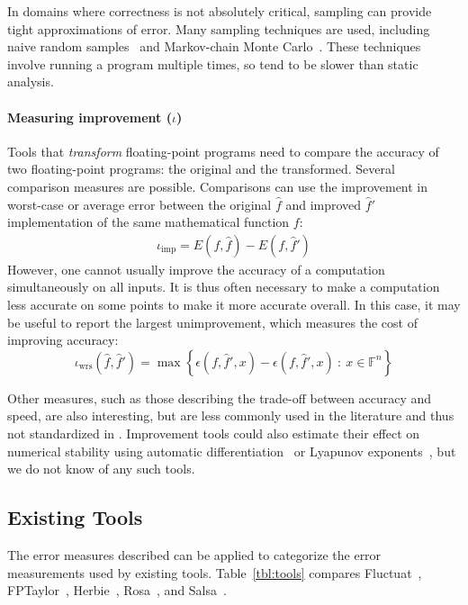 \documentclass[main.tex]{subfiles}
\begin{document}
In domains where correctness is not absolutely critical,
  sampling can provide tight approximations of error.
Many sampling techniques are used,
  including naive random samples~\cite{pavel15}
  and Markov-chain Monte Carlo~\cite{stoke-fp}.
These techniques involve running a program multiple times,
  so tend to be slower than static analysis.

\paragraph{Measuring improvement ($\iota$)}

Tools that \emph{transform} floating-point programs
  need to compare the accuracy of two floating-point programs:
  the original and the transformed.
Several comparison measures are possible.
Comparisons can use the improvement in worst-case or average error
  between the original $\hat f$ and improved $\hat f'$ implementation
  of the same mathematical function $f$:
\begin{align*}
  \iota_{\text{imp}} = E(f, \hat{f}) - E(f, \hat{f}')
\end{align*}
However, one cannot usually
  improve the accuracy of a computation
  simultaneously on all inputs.
It is thus often necessary
  to make a computation less accurate on some points
  to make it more accurate overall.
In this case, it may be useful to report the largest unimprovement,
  which measures the cost of improving accuracy:
\begin{equation*}
  \iota_{\text{wrs}}(\hat{f},\hat{f}') = \max \left\{ \epsilon(f, \hat{f}', x) - \epsilon(f, \hat{f}', x)   
\ :\ x\in \mathbb{F}^n\right\}
\end{equation*}

Other measures,
  such as those describing the trade-off between accuracy and speed,
  are also interesting, but are less commonly used in the literature
  and thus not standardized in \name.
Improvement tools could also estimate their effect on numerical stability
  using automatic differentiation~\cite{GW08} or Lyapunov exponents~\cite{Sri13},
  but we do not know of any such tools.

\subsection{Existing Tools}

The error measures described can be applied
  to categorize the error measurements used by existing tools.
Table~\ref{tbl:tools} compares Fluctuat~\cite{Goubault13},
  FPTaylor~\cite{fptaylor-fm15}, Herbie~\cite{pavel15},
  Rosa~\cite{DarulovaK14}, and Salsa~\cite{fmics15}.
\end{document}
